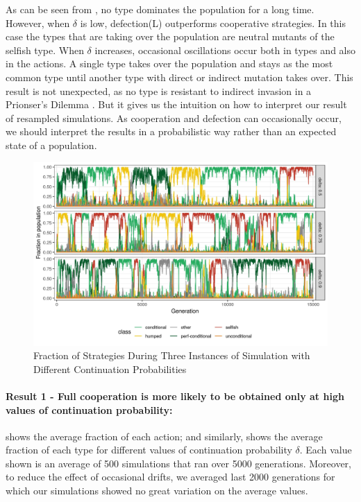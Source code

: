 \documentclass[12pt]{article}
\begin{document}
 As can be seen from , no type dominates the population for a long time. However, when $\delta$ is low, defection(L) outperforms cooperative strategies. In this case the types that are taking over the population are neutral mutants of the selfish type. When $\delta$ increases, occasional oscillations occur both in types and also in the actions. A single type takes over the population and stays as the most common type until another type with direct or indirect mutation takes over.  This result is not unexpected, as no type is resistant to indirect invasion in a Prionser's Dilemma \citep{Van_Veelen2012-xf, Garcia2016-tr, Garcia2018-aj}. But it gives us the intuition on how to interpret our result of resampled simulations. As cooperation and defection can occasionally occur, we should interpret the results in a probabilistic way rather than an expected state of a population.
\begin{figure}[H]
	\centering
	\includegraphics[width=1\linewidth]{img/types_singlerun2}
	\caption[Fraction of Strategies During Three Instances]{Fraction of Strategies During Three Instances of Simulation with Different Continuation Probabilities}
	\label{fig:evo-typessingle}
\end{figure}

\paragraph{Result 1 - Full cooperation is more likely to be obtained only at high values of continuation probability:}

 shows the average fraction of each action; and similarly,  shows the average fraction of each type for different values of continuation probability $\delta$. Each value shown is an average of 500 simulations that ran over 5000 generations. Moreover, to reduce the effect of occasional drifts, we averaged last 2000 generations for which our simulations showed no great variation on the average values.
\end{document}
